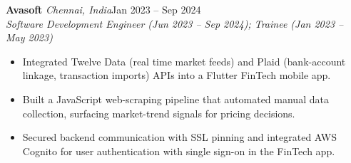 \documentclass[a4paper,11pt]{article}
\newcommand{\role}[4]{%
  \textbf{#1}{\color{muted}\,\textperiodcentered\,\textit{#2}}\hfill{\color{muted}#3}\\
  \textit{#4}\par}
\newcommand{\gap}{\vspace{5pt}}
\begin{document}
\gap
{}
\role{Avasoft}{Chennai, India}{Jan 2023 – Sep 2024}{Software Development Engineer (Jun 2023 – Sep 2024); Trainee (Jan 2023 – May 2023)}
\begin{itemize}
  \item Integrated Twelve Data (real time market feeds) and Plaid (bank-account linkage, transaction imports) APIs into a Flutter FinTech mobile app.
  \item Built a JavaScript web-scraping pipeline that automated manual data collection, surfacing market-trend signals for pricing decisions.
  \item Secured backend communication with SSL pinning and integrated AWS Cognito for user authentication with single sign-on in the FinTech app.
\end{itemize}
\end{document}

